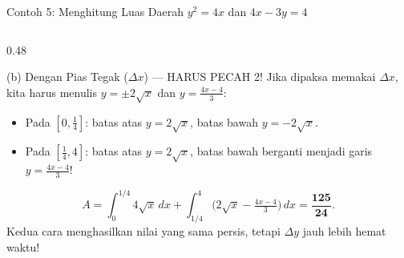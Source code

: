 \documentclass[aspectratio=43,10pt]{beamer}
\begin{document}
\begin{frame}{Contoh 5: Menghitung Luas Daerah $y^2 = 4x$ dan $4x - 3y = 4$}
\begin{columns}[T]
        \begin{column}{0.48\textwidth}
            \begin{alertblock}{(b) Dengan Pias Tegak ($\Delta x$) --- HARUS PECAH 2!}
                \scriptsize\abovedisplayskip=2pt\belowdisplayskip=2pt
                Jika dipaksa memakai $\Delta x$, kita harus menulis $y = \pm 2\sqrt{x}$ dan $y = \frac{4x - 4}{3}$:
                \begin{itemize}\itemsep=1pt
                    \item Pada $\left[0, \frac{1}{4}\right]$: batas atas $y = 2\sqrt{x}$, batas bawah $y = -2\sqrt{x}$.
                    \item Pada $\left[\frac{1}{4}, 4\right]$: batas atas $y = 2\sqrt{x}$, batas bawah berganti menjadi garis $y = \frac{4x - 4}{3}$!
                \end{itemize}
                $$A = \int_{0}^{1/4}\! 4\sqrt{x}\,dx + \int_{1/4}^{4}\! \big(2\sqrt{x} - \tfrac{4x - 4}{3}\big)\,dx = \mathbf{\frac{125}{24}}.$$
                {\tiny\color{TealCyan}Kedua cara menghasilkan nilai yang sama persis, tetapi $\Delta y$ jauh lebih hemat waktu!}
            \end{alertblock}
        \end{column}
    \end{columns}
\end{frame}
\end{document}
